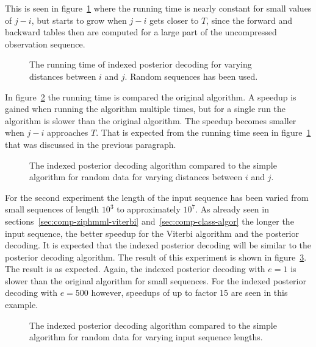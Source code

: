 This is seen in
figure~\ref{fig:assymptotic_indexed_posterior_subseq_length.tex} where the
running time is nearly constant for small values of $j - i$, but starts to grow
when $j - i$ gets closer to $T$, since the forward and backward tables then are
computed for a large part of the uncompressed observation sequence.

\begin{figure}
  \centering
  
  \caption{The running time of indexed posterior decoding for varying distances
    between $i$ and $j$. Random sequences has been used.}
  \label{fig:assymptotic_indexed_posterior_subseq_length.tex}
\end{figure}

In figure~\ref{fig:indexed_posterior_speedup_vs_subseq} the running time is
compared the original algorithm. A speedup is gained when running the
algorithm multiple times, but for a single run the algorithm is slower than the
original algorithm. The speedup becomes smaller when $j - i$ approaches
$T$. That is expected from the running time seen in
figure~\ref{fig:assymptotic_indexed_posterior_subseq_length.tex} that was
discussed in the previous paragraph.

\begin{figure}
  \centering
  
  \caption{The indexed posterior decoding algorithm compared to the simple
    algorithm for random data for varying distances between $i$ and $j$.}
  \label{fig:indexed_posterior_speedup_vs_subseq}
\end{figure}

For the second experiment the length of the input sequence has been varied from
small sequences of length $10^3$ to approximately $10^7$. As already seen in
sections~\ref{sec:comp-ziphmml-viterbi} and~\ref{sec:comp-class-algor} the
longer the input sequence, the better speedup for the Viterbi algorithm and the
posterior decoding. It is expected that the indexed posterior
decoding will be similar to the posterior decoding algorithm. The
result of this experiment is shown in
figure~\ref{fig:indexed_posterior_speedup_vs_T}. The result is as
expected. Again, the indexed posterior decoding with $e = 1$ is slower than
the original algorithm for small sequences. For the indexed posterior
decoding with $e = 500$ however, speedups of up to factor 15 are seen in this
example.

\begin{figure}
  \centering
  
  \caption{The indexed posterior decoding algorithm compared to the simple
    algorithm for random data for varying input sequence lengths.}
  \label{fig:indexed_posterior_speedup_vs_T}
\end{figure}


